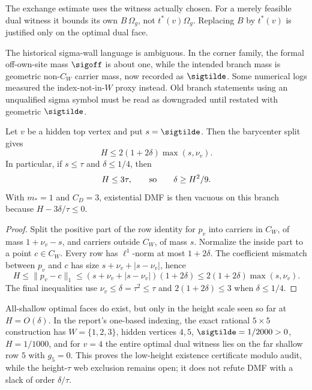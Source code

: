 \begin{warning}
\provedbadge\label{warn:feasible-optimal-gap}
The exchange estimate uses the witness actually chosen.  For a merely
feasible dual witness it bounds its own \(B\,\Omega_g\), not
\(t^*(v)\Omega_g\).  Replacing \(B\) by \(t^*(v)\) is justified only on
the optimal dual face.
\end{warning}

\begin{warning}
\downgradedbadge\label{warn:old-sigma}
The historical sigma-wall language is ambiguous.  In the corner family,
the formal off-own-site mass \(\sigoff\) is about one, while the intended
branch mass is geometric non-\(C_W\) carrier mass, now recorded as
\(\sigtilde\).  Some numerical logs measured the index-not-in-\(W\)
proxy instead.  Old branch statements using an unqualified sigma symbol
must be read as downgraded until restated with geometric \(\sigtilde\).
\end{warning}

\begin{proposition}
\provedbadge\label{prop:sigtilde-height-cap}
Let \(v\) be a hidden top vertex and put \(s=\sigtilde\).  Then the
barycenter split gives
\[
        H\le 2(1+2\delta)\max(s,\nu_v).
\]
In particular, if \(s\le\tau\) and \(\delta\le1/4\), then
\[
        H\le 3\tau,\qquad\hbox{so}\qquad \delta\ge H^2/9 .
\]
With \(m_*=1\) and \(C_D=3\), existential DMF is then vacuous on this
branch because \(H-3\delta/\tau\le0\).
\end{proposition}

\begin{proof}
Split the positive part of the row identity for \(p_v\) into carriers in
\(C_W\), of mass \(1+\nu_v-s\), and carriers outside \(C_W\), of mass
\(s\).  Normalize the inside part to a point \(c\in C_W\).  Every row has
\(\ell^1\)-norm at most \(1+2\delta\).  The coefficient mismatch between
\(p_v\) and \(c\) has size \(s+\nu_v+|s-\nu_v|\), hence
\[
        H\le\|p_v-c\|_1
        \le (s+\nu_v+|s-\nu_v|)(1+2\delta)
        \le 2(1+2\delta)\max(s,\nu_v).
\]
The final inequalities use \(\nu_v\le\delta=\tau^2\le\tau\) and
\(2(1+2\delta)\le3\) when \(\delta\le1/4\).
\end{proof}

\begin{warning}
\modauditbadge\label{warn:all-shallow-height}
All-shallow optimal faces do exist, but only in the height scale seen so
far at \(H=O(\delta)\).  In the report's one-based indexing, the exact
rational \(5\times5\) construction has \(W=\{1,2,3\}\), hidden vertices
\(4,5\), \(\sigtilde=1/2000>0\), \(H=1/1000\), and for \(v=4\) the
entire optimal dual witness lies on the far shallow row \(5\) with
\(g_5=0\).  This proves the low-height existence certificate modulo audit,
while the height-\(\tau\) web exclusion remains open; it does not refute DMF
with a slack of order \(\delta/\tau\).
\end{warning}

